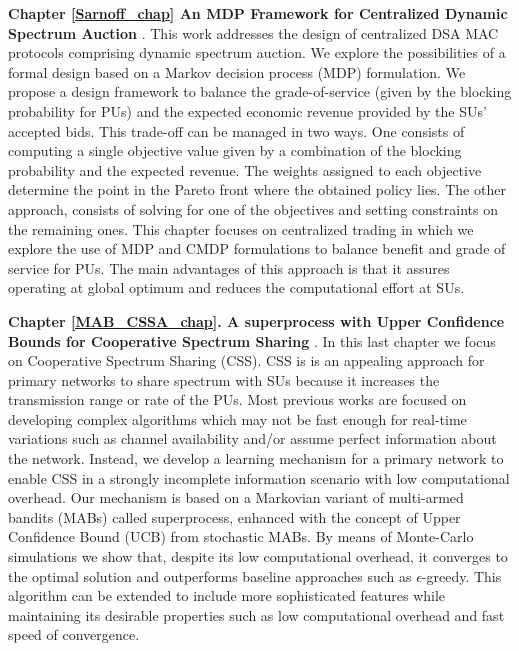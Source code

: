 \textbf{Chapter \ref{Sarnoff_chap} An MDP Framework for Centralized Dynamic Spectrum Auction} \cite{ref:Alcaraz2012}.
This work addresses the design of centralized DSA MAC protocols comprising dynamic spectrum auction. We explore the possibilities of a formal design based on a Markov decision process (MDP) formulation. We propose a design framework to balance the grade-of-service (given by the blocking probability for PUs) and the expected economic revenue provided by the SUs' accepted bids. 
This trade-off can be managed in two ways. One consists of computing a single objective value given by a combination of the blocking probability and the expected revenue. 
The weights assigned to each objective determine the point in the Pareto front where the obtained policy lies. The other approach, consists of solving for one of the objectives and setting constraints on the remaining ones.
This chapter focuses on centralized trading in which we explore the use of MDP and CMDP formulations to balance benefit and grade of service for PUs. 
The main advantages of this approach is that it assures operating at global optimum and reduces the computational effort at SUs.

\textbf{Chapter \ref{MAB_CSSA_chap}. A superprocess with Upper Confidence Bounds for Cooperative Spectrum Sharing} \cite{ref:Mario2015_MAB_CSSA_1,ref:Mario2015_MAB_CSSA_2}. In this last chapter we focus on Cooperative Spectrum Sharing (CSS). CSS is is an appealing approach for primary networks to share spectrum with SUs because it increases the transmission range or rate of the PUs. Most previous works are focused on developing complex algorithms which may not be fast enough for real-time variations such as channel availability and/or assume perfect information about the network. Instead, we develop a learning mechanism for a primary network to enable CSS in a strongly incomplete information scenario with low computational overhead. Our mechanism is based on a Markovian variant of multi-armed bandits (MABs) called superprocess, enhanced with the concept of Upper Confidence Bound (UCB) from stochastic MABs. By means of Monte-Carlo simulations we show that, despite its low computational overhead, it converges to the optimal solution and outperforms baseline approaches such as $\epsilon$-greedy. This algorithm can be extended to include more sophisticated features while maintaining its desirable properties such as low computational overhead and fast speed of convergence. 


